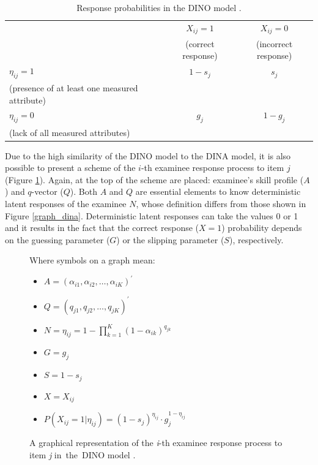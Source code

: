\documentclass[english]{pwr_wmat_praca_dyplomowa}
\theoremstyle{plain}
\theoremstyle{definition}
\numberwithin{theorem}{chapter}
\begin{document}
\begin{table}[H]
	\centering
	\begin{tabular}{l c c} 
		\hline
		{\rule{0pt}{3ex}} & $X_{ij} = 1$ & $X_{ij} = 0$ \\
		& (correct response) & (incorrect response) \\ [0.5ex]
		\hline 
		{\rule{0pt}{3ex}} $\eta_{ij} = 1$ & $1- s_j$ & $s_j$ \\ 
		(presence of at least one measured attribute) & & \\[1ex] 
		$\eta_{ij} = 0$ & $g_j$ & $1-g_j$ \\ 
		(lack of all measured attributes) & & \\[0.5ex] 
		\hline
	\end{tabular}
	\caption{Response probabilities in the DINO model \cite{book_tables}.}
	\label{tab:response_prob2} 
\end{table}

Due to the high similarity of the DINO model to the DINA model, it is also possible to present a scheme of the $i$-th examinee response process to item $j$ (Figure \ref{graph_dino}). Again, at the top of the scheme are placed: examinee's skill profile ($A$) and $q$-vector ($Q$). Both $A$ and $Q$ are essential elements to know deterministic latent responses of the examinee $N$, whose definition differs from those shown in Figure \ref{graph_dina}. Deterministic latent responses can take the values 0 or 1 and it results in the fact that the correct response ($X=1$) probability depends on the guessing parameter ($G$) or the slipping parameter ($S$), respectively.

\begin{figure}[!ht]
	\centering
	\begin{multicols}{2}
		
		Where symbols on a graph mean:
		\begin{itemize}
			\item $A = (\alpha_{i1}, \alpha_{i2}, \ldots, \alpha_{iK} )^{'}$
			\item $Q = (q_{j1}, q_{j2}, \ldots, q_{jK} )^{'}$
			\item $N = \eta_{ij} = 1- \prod\limits_{k=1}^{K} \left( 1 - \alpha_{ik} \right)^{q_{jk}}$
			\item $G = g_j$
			\item $S = 1-s_j$
			\item $X = X_{ij}$
			\item $P(X_{ij} = 1 | \eta_{ij}) = (1-s_j)^{\eta_{ij}} \cdot g_j^{1-\eta_{ij}}$
		\end{itemize}
	\end{multicols} 
	\caption{A graphical representation of the \textit{i}-th examinee response process to item \textit{j} in~the~DINO model \cite{de_la_torre_2009}.}\label{graph_dino}
\end{figure}
\end{document}
